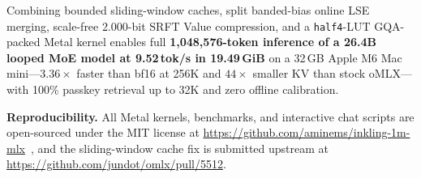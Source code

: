 \documentclass[conference]{IEEEtran}
\begin{document}
Combining bounded sliding-window caches, split banded-bias online LSE merging, scale-free 2.000-bit SRFT Value compression, and a \texttt{half4}-LUT GQA-packed Metal kernel enables full \textbf{1{,}048{,}576-token inference of a 26.4B looped MoE model at 9.52\,tok/s in 19.49\,GiB} on a 32\,GB Apple M6 Mac mini—$3.36\times$ faster than bf16 at 256K and $44\times$ smaller KV than stock oMLX—with 100\% passkey retrieval up to 32K and zero offline calibration.

\smallskip
\noindent\textbf{Reproducibility.} All Metal kernels, benchmarks, and interactive chat scripts are open-sourced under the MIT license at \url{https://github.com/aminems/inkling-1m-mlx}~\cite{inkling1mmlx}, and the sliding-window cache fix is submitted upstream at \url{https://github.com/jundot/omlx/pull/5512}.

\balance


\end{document}
